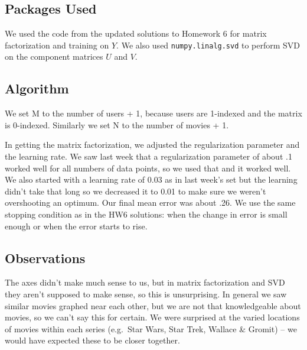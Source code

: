 \subsection{Packages Used}
We used the code from the updated solutions to Homework 6 for matrix factorization and training on $Y$. We also used {\tt numpy.linalg.svd} to perform SVD on the component matrices $U$ and $V$.

\subsection{Algorithm}
We set M to the number of users + 1, because users are 1-indexed and the matrix is 0-indexed. Similarly we set N to the number of movies + 1.

In getting the matrix factorization, we adjusted the regularization parameter and the learning rate. We saw last week that a regularization parameter of about .1 worked well for all numbers of data points, so we used that and it worked well. We also started with a learning rate of 0.03 as in last week's set but the learning didn't take that long so we decreased it to 0.01 to make sure we weren't overshooting an optimum. Our final mean error was about .26. We use the same stopping condition as in the HW6 solutions: when the change in error is small enough or when the error starts to rise.

\subsection{Observations}
The axes didn't make much sense to us, but in matrix factorization and SVD they aren't supposed to make sense, so this is unsurprising. In general we saw similar movies graphed near each other, but we are not that knowledgeable about movies, so we can't say this for certain. We were surprised at the varied locations of movies within each series (e.g.\ Star Wars, Star Trek, Wallace \& Gromit) -- we would have expected these to be closer together.

